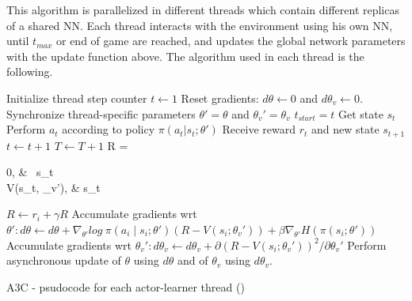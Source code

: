This algorithm is parallelized in different threads which contain different replicas of a shared \ac{NN}.
Each thread interacts with the environment using his own \ac{NN}, until $t_{max}$ or end of game are reached, and updates the
global network parameters with the update function above.
The algorithm used in each thread is the following.

\begin{algorithm}[hbtp]
\begin{algorithmic}
    \State {}
    \State {}
    \State Initialize thread step counter $t \leftarrow 1$
    \Repeat
        \State Reset gradients: $d\theta \leftarrow 0$ and $d\theta_v \leftarrow 0$.
        \State Synchronize thread-specific parameters $\theta' = \theta$ and $\theta_v' = \theta_v$
        \State $t_{start} = t$
        \State Get state $s_t$
        \Repeat
            \State Perform $a_t$ according to policy $\pi(a_t|s_t;\theta')$
            \State Receive reward $r_t$ and new state $s_{t+1}$
            \State $t \leftarrow t + 1$
            \State $T \leftarrow T + 1$
        \State R = \begin{cases}
                0,   & \ s_t \\
                V(s_t, \theta_v'),   &  s_t \;\\
            \end{cases}
            \State $R \leftarrow r_i + \gamma R$
            \State Accumulate gradients wrt $\theta': d\theta \leftarrow d\theta + \nabla_{\theta'} log\:\pi(a_i\mid s_i;\theta')(R-V(s_i;\theta_v'))+\beta\nabla_{\theta'}H(\pi(s_i;\theta'))$
            \State Accumulate gradients wrt $\theta_v': d\theta_v \leftarrow d\theta_v + \partial(R-V(s_i;\theta_v'))^2 / \partial \theta_{v}'$
        \EndFor
        \State Perform asynchronous update of $\theta$ using $d\theta$ and of $\theta_v$ using $d\theta_v$.
\end{algorithmic}
\caption{\acl{A3C} - psudocode for each actor-learner thread (\cite{mnih2016A3C})}
\label{alg:A3C}
\end{algorithm}


